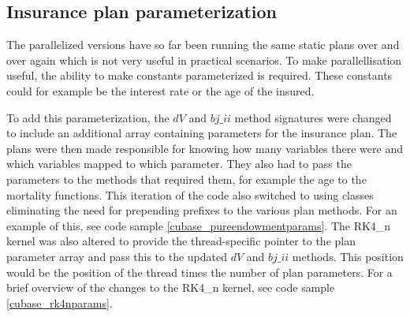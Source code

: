 \begin{table}[h!]
\centering
{}
\caption{F\# Alea.cuBase calculations per ms with double precision\label{table:cubaseManualdoubletime}}
\end{table}

\subsection{Insurance plan parameterization}
The parallelized versions have so far been running the same static plans over and over again which is not very useful in practical scenarios.
To make parallellisation useful, the ability to make constants parameterized is required.
These constants could for example be the interest rate or the age of the insured.

To add this parameterization, the $dV$ and $bj\_ii$ method signatures were changed to include an additional array containing parameters for the insurance plan.
The plans were then made responsible for knowing how many variables there were and which variables mapped to which parameter. 
They also had to pass the parameters to the methods that required them, for example the age to the mortality functions.
This iteration of the code also switched to using classes eliminating the need for prepending prefixes to the various plan methods.
For an example of this, see code sample \ref{cubase_pureendowmentparams}.
The RK4\_n kernel was also altered to provide the thread-specific pointer to the plan parameter array and pass this to the updated $dV$ and $bj\_ii$ methods.
This position would be the position of the thread times the number of plan parameters.
For a brief overview of the changes to the RK4\_n kernel, see code sample \ref{cubase_rk4nparams}.

